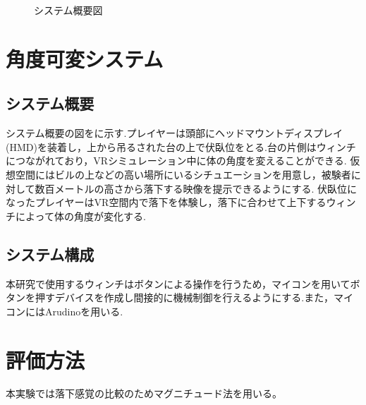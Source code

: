 \documentclass[uplatex]{jsarticle}
\begin{document}
 \begin{figure}[tb]
  \centering
  \caption{システム概要図}
  \label{fig:about_system}

\end{figure}

\section{角度可変システム}
\subsection{システム概要}
システム概要の図をに示す.プレイヤーは頭部にヘッドマウントディスプレイ(HMD)を装着し，上から吊るされた台の上で伏臥位をとる.台の片側はウィンチにつながれており，VRシミュレーション中に体の角度を変えることができる.
仮想空間にはビルの上などの高い場所にいるシチュエーションを用意し，被験者に対して数百メートルの高さから落下する映像を提示できるようにする.
伏臥位になったプレイヤーはVR空間内で落下を体験し，落下に合わせて上下するウィンチによって体の角度が変化する.

\subsection{システム構成}
本研究で使用するウィンチはボタンによる操作を行うため，マイコンを用いてボタンを押すデバイスを作成し間接的に機械制御を行えるようにする.また，マイコンにはArudinoを用いる.

\section{評価方法}
本実験では落下感覚の比較のためマグニチュード法を用いる。
\end{document}
